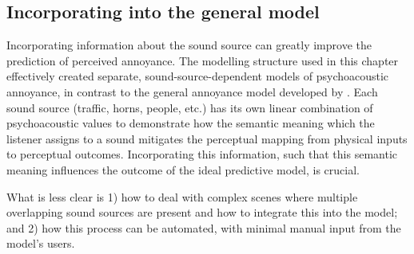\subsection{Incorporating into the general model}
Incorporating information about the sound source can greatly improve the prediction of perceived annoyance. The modelling structure used in this chapter effectively created separate, sound-source-dependent models of psychoacoustic annoyance, in contrast to the general annoyance model developed by \citet{PsychoacousticsfactsmodelsZwicker}. Each sound source (traffic, horns, people, etc.) has its own linear combination of psychoacoustic values to demonstrate how the semantic meaning which the listener assigns to a sound mitigates the perceptual mapping from physical inputs to perceptual outcomes. Incorporating this information, such that this semantic meaning influences the outcome of the ideal predictive model, is crucial.

What is less clear is 1) how to deal with complex scenes where multiple overlapping sound sources are present and how to integrate this into the model; and 2) how this process can be automated, with minimal manual input from the model's users. %